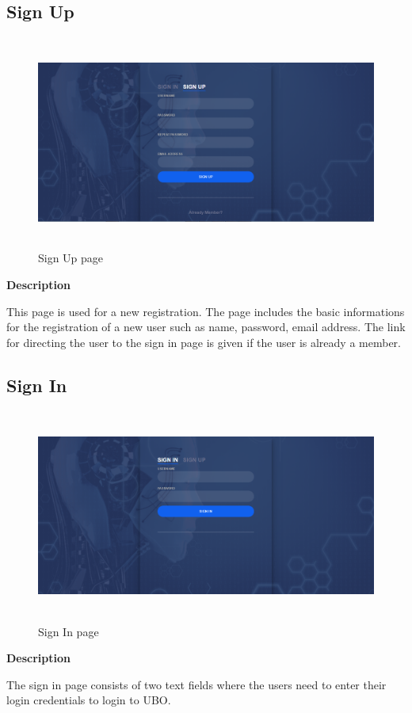 \documentclass[12pt,a4paper,oneside]{report}
\begin{document}
\newpage
\subsection{Sign Up}
\begin{figure}[h]
	\begin{center}
		\includegraphics[width=13cm,height=7cm]{sign_up.png}
			\caption{Sign Up page}
			\label{Sign Up page}
	\end{center}
\end{figure}
\textbf{Description}
\par This page is used for a new registration. The page includes the basic informations for the registration of a new user such as name, password, email address. The link for directing the user to the sign in page is given if the user is already a member.
\newpage
\subsection{Sign In}
\begin{figure}[h]
	\begin{center}
		\includegraphics[width=13cm,height=7cm]{sign_in.png}
			\caption{Sign In page}
			\label{Sign In page}
	\end{center}
\end{figure}
\textbf{Description}
\par The sign in page consists of two text fields where the users need to enter their login credentials to login to UBO.
\end{document}
